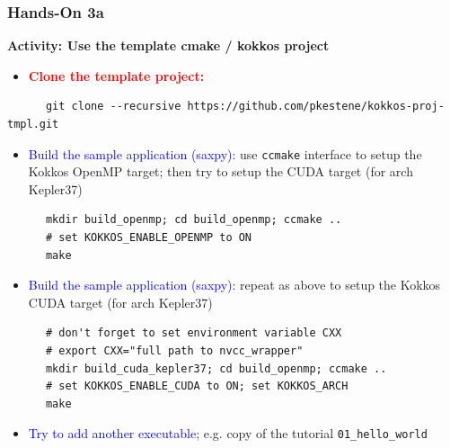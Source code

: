 \begin{frame}[fragile=singleslide]
  \frametitle{Hands-On 3a}

  {\large \bf Activity: Use the template cmake / kokkos project}

  \begin{itemize}
  \item \textcolor{red}{\bf Clone the template project:}
  \end{itemize}
  {\small
    \begin{verbatim}
      git clone --recursive https://github.com/pkestene/kokkos-proj-tmpl.git
    \end{verbatim}
  }
  \begin{itemize}
  \item \textcolor{blue}{Build the sample application (saxpy)}: use \texttt{ccmake} interface to setup the Kokkos OpenMP target; then try to setup the CUDA target (for arch Kepler37)
  \end{itemize}
  {\small
    \begin{verbatim}
      mkdir build_openmp; cd build_openmp; ccmake ..
      # set KOKKOS_ENABLE_OPENMP to ON
      make
    \end{verbatim}
  }
  \begin{itemize}
  \item \textcolor{blue}{Build the sample application (saxpy)}: repeat as above to setup the Kokkos CUDA target (for arch Kepler37)
  \end{itemize}
  {\small
    \begin{verbatim}
      # don't forget to set environment variable CXX
      # export CXX="full path to nvcc_wrapper"
      mkdir build_cuda_kepler37; cd build_openmp; ccmake ..
      # set KOKKOS_ENABLE_CUDA to ON; set KOKKOS_ARCH
      make
    \end{verbatim}
  }
  \begin{itemize}
  \item \textcolor{blue}{Try to add another executable}; e.g. copy of the tutorial \texttt{01\_hello\_world}
  \end{itemize}

\end{frame}

